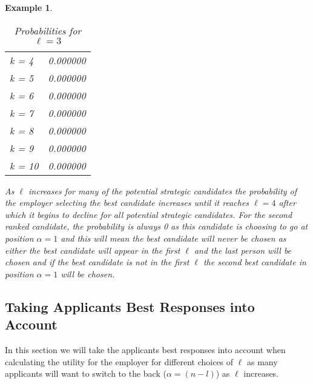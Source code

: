 \documentclass{article}
\newtheorem{example}{Example} %
\begin{document}
\begin{example}
\begin{table}[H]
\begin{minipage}{0.33\textwidth}
\begin{tabular}{lr}
k = 4  &     0.000000 \\
k = 5  &     0.000000 \\
k = 6  &     0.000000  \\
k = 7  &     0.000000 \\
k = 8  &     0.000000  \\
k = 9  &     0.000000  \\
k = 10 &     0.000000  \\
\hline
\end{tabular}
\caption{Probabilities for $\ell=3$}
\end{minipage}\hfill
\end{table}
As $\ell$ increases for many of the potential strategic candidates the probability of the employer selecting the best candidate increases until it reaches $\ell = 4$ after which it begins to decline for all potential strategic candidates. For the second ranked candidate, the probability is always 0 as this candidate is choosing to go at position $\alpha = 1$ and this will mean the best candidate will never be chosen as either the best candidate will appear in the first $\ell$ and the last person will be chosen and if the best candidate is not in the first $\ell$ the second best candidate in position $\alpha = 1$ will be chosen.
\end{example}

\subsection{Taking Applicants Best Responses into Account}

In this section we will take the applicants best responses into account when calculating the utility for the employer for different choices of $\ell$ as many applicants will want to switch to the back ($\alpha = (n-l)$) as $\ell$ increases.
\end{document}
